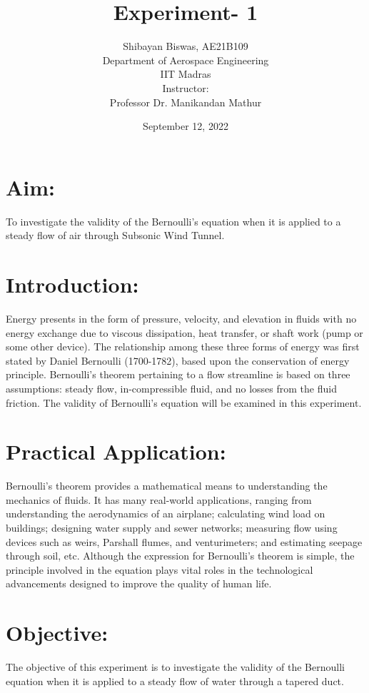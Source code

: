 \documentclass[12pt,a4paper]{article}
\title{Experiment- 1}
\author{Shibayan Biswas, AE21B109\\ Department of Aerospace Engineering\\ IIT Madras\\[3ex] Instructor:\\ \large Professor Dr. Manikandan Mathur}
\date{September 12, 2022}
\begin{document}
\maketitle
\hline


\section{Aim:}
To investigate the validity of the Bernoulli's equation when it is applied to a steady flow of air through Subsonic Wind Tunnel. 
\section{Introduction:}
Energy presents in the form of pressure, velocity, and elevation in fluids with no energy exchange due to viscous dissipation, heat transfer, or shaft work (pump or some other device). The relationship among these three forms of energy was first stated by Daniel Bernoulli (1700-1782), based upon the conservation of energy principle. Bernoulli’s theorem pertaining to a flow streamline is based on three assumptions: steady flow, in-compressible fluid, and no losses from the fluid friction. The validity of Bernoulli’s equation will be examined in this experiment.
\section{Practical Application:}
Bernoulli’s theorem provides a mathematical means to understanding the mechanics of fluids. It has many real-world applications, ranging from understanding the aerodynamics of an airplane; calculating wind load on buildings; designing water supply and sewer networks; measuring flow using devices such as weirs, Parshall flumes, and venturimeters; and estimating seepage through soil, etc. Although the expression for Bernoulli’s theorem is simple, the principle involved in the equation plays vital roles in the technological advancements designed to improve the quality of human life.
\section{Objective:}
The objective of this experiment is to investigate the validity of the Bernoulli equation when it is applied to a steady flow of water through a tapered duct.
\end{document}
